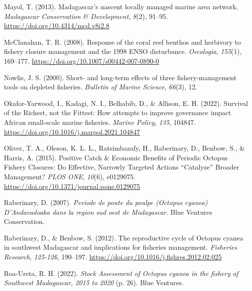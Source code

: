 \documentclass[
]{article}
\newlength{\cslhangindent}
\newlength{\cslentryspacingunit} %
\newenvironment{CSLReferences}[2] %
 {%
  \setlength{\parindent}{0pt}
  \ifodd #1
  \let\oldpar\par
  \def\par{\hangindent=\cslhangindent\oldpar}
  \fi
  \setlength{\parskip}{#2\cslentryspacingunit}
 }%
 {}
\begin{document}
\begin{CSLReferences}{1}{2}
\leavevmode{}%
Mayol, T. (2013). Madagascar's nascent locally managed marine area network. \emph{Madagascar Conservation \& Development}, \emph{8}(2), 91--95. \url{https://doi.org/10.4314/mcd.v8i2.8}

\leavevmode{}%
McClanahan, T. R. (2008). Response of the coral reef benthos and herbivory to fishery closure management and the 1998 {ENSO} disturbance. \emph{Oecologia}, \emph{155}(1), 169--177. \url{https://doi.org/10.1007/s00442-007-0890-0}

\leavevmode{}%
Nowlis, J. S. (2000). Short- and long-term effects of three fishery-management tools on depleted fisheries. \emph{Bulletin of Marine Science}, \emph{66}(3), 12.

\leavevmode{}%
Okafor-Yarwood, I., Kadagi, N. I., Belhabib, D., \& Allison, E. H. (2022). Survival of the {Richest}, not the {Fittest}: {How} attempts to improve governance impact {African} small-scale marine fisheries. \emph{Marine Policy}, \emph{135}, 104847. \url{https://doi.org/10.1016/j.marpol.2021.104847}

\leavevmode{}%
Oliver, T. A., Oleson, K. L. L., Ratsimbazafy, H., Raberinary, D., Benbow, S., \& Harris, A. (2015). Positive {Catch} \& {Economic} {Benefits} of {Periodic} {Octopus} {Fishery} {Closures}: {Do} {Effective}, {Narrowly} {Targeted} {Actions} {``{Catalyze}''} {Broader} {Management}? \emph{PLOS ONE}, \emph{10}(6), e0129075. \url{https://doi.org/10.1371/journal.pone.0129075}

\leavevmode{}%
Raberinary, D. (2007). \emph{Periode de ponte du poulpe ({Octopus} cyanea) {D}'{Andavadoaka} dans la region sud oest de {Madagascar}}. Blue Ventures Conservation.

\leavevmode{}%
Raberinary, D., \& Benbow, S. (2012). The reproductive cycle of {Octopus} cyanea in southwest {Madagascar} and implications for fisheries management. \emph{Fisheries Research}, \emph{125-126}, 190--197. \url{https://doi.org/10.1016/j.fishres.2012.02.025}

\leavevmode{}%
Roa-Ureta, R. H. (2022). \emph{Stock {Assessment} of {Octopus} cyanea in the fishery of {Southwest} {Madagascar}, 2015 to 2020} (p. 26). Blue Ventures.


\end{CSLReferences}
\end{document}
